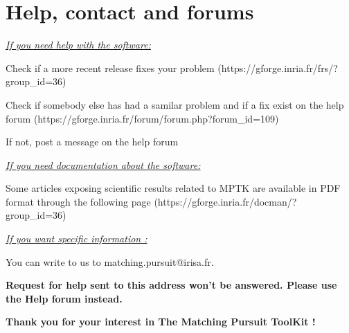 \chapter{Help, contact and forums}

\noindent \underline{\emph{If you need help with the software:}}
\begin{my_enumerate}
	\item Check if a more recent release fixes your problem (https://gforge.inria.fr/frs/?group\_id=36)
	\item Check if somebody else has had a samilar problem and if a fix exist on the help forum (https://gforge.inria.fr/forum/forum.php?forum\_id=109)
	\item If not, post a message on the help forum
\end{my_enumerate}

\noindent \underline{\emph{If you need documentation about the software:}}

\vspace{0.2 cm}

Some articles exposing scientific results related to MPTK are available in PDF format through the following page (https://gforge.inria.fr/docman/?group\_id=36)

\vspace{0.2 cm}

\noindent \underline{\emph{If you want specific information :}}

\vspace{0.2 cm}

You can write to us to matching.pursuit@irisa.fr.


\begin{center}
	\Large{\textbf{Request for help sent to this address won't be answered. Please use the Help forum instead.}}
\end{center}
\noindent \textbf{Thank you for your interest in The Matching Pursuit ToolKit ! }

